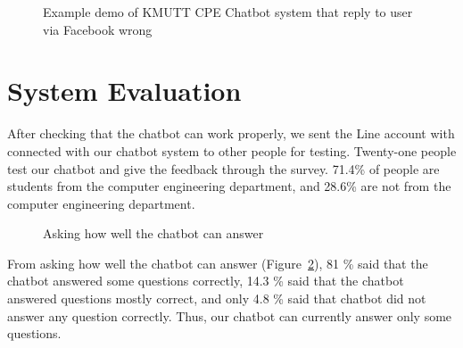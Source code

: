 \documentclass[12pt,oneside,openright,a4paper]{cpe-english-project}
\begin{document}
\begin{figure}[!h]\centering
{}
\caption{Example demo of KMUTT CPE Chatbot system that reply to user via Facebook wrong}
\label{fig:demo_chat_wrong}
\end{figure}

\pagebreak
\section{System Evaluation}
\label{system_evaluation}
After checking that the chatbot can work properly, we sent the Line account with connected with our chatbot system to other people for testing. Twenty-one people test our chatbot and give the feedback through the survey. 71.4\% of people are students from the computer engineering department, and 28.6\% are not from the computer engineering department.

\begin{figure}[!h]\centering
	\caption{Asking how well the chatbot can answer}
	\label{fig:chatbot_quality}
\end{figure}

From asking how well the chatbot can answer (Figure~\ref*{fig:chatbot_quality}), 81 \% said that the chatbot answered some questions correctly, 14.3 \% said that the chatbot answered questions mostly correct, and only 4.8 \% said that chatbot did not answer any question correctly. Thus, our chatbot can currently answer only some questions.
\end{document}
